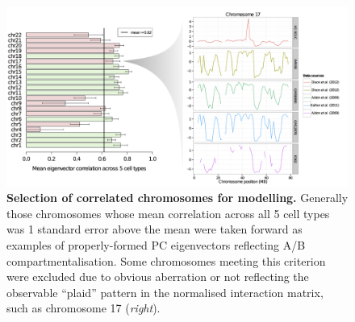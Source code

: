 \documentclass[a4paper]{report}
\begin{document}
\begin{figure}[H]
\vspace{-12pt}
\begin{center}
\includegraphics[width=1.08\textwidth]{figs/s2_full.png}
\captionsetup{width=\textwidth}
\caption{ {\bf Selection of correlated chromosomes for modelling.}
Generally those chromosomes whose mean correlation across all 5 cell
types was 1 standard error above the mean were taken forward as
examples of properly-formed PC eigenvectors reflecting A/B
compartmentalisation. Some chromosomes meeting this criterion were
excluded due to obvious aberration or not reflecting the observable
``plaid'' pattern in the normalised interaction matrix, such as
chromosome 17 (\emph{right}).  
}\label{fig:chrselect}
\end{center} 
\end{figure} 
\end{document}

